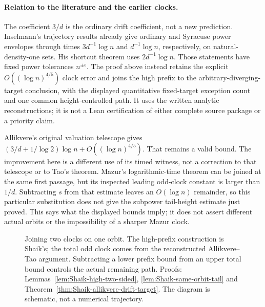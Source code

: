 \paragraph{Relation to the literature and the earlier clocks.}
The coefficient \(3/d\) is the ordinary drift coefficient, not a new
prediction. Inselmann's \cite[Theorems 1.9--1.10]{Inselmann2024v3}
trajectory results already give ordinary and Syracuse power envelopes
through times \(3d^{-1}\log n\) and \(d^{-1}\log n\), respectively,
on natural-density-one sets. His shortcut theorem uses
\(2d^{-1}\log n\). Those statements have fixed power tolerances
\(n^{\pm\epsilon}\). The proof above instead retains the explicit
\(O((\log n)^{4/5})\) clock error and joins the high prefix to the
arbitrary-diverging-target conclusion, with the displayed quantitative
fixed-target exception count and one common height-controlled path.
It uses the written analytic reconstructions; it is not a Lean
certification of either complete source package or a priority claim.

Allikvere's original valuation telescope gives
\((3/d+1/\log2)\log n+O((\log n)^{4/5})\).
That remains a valid bound. The improvement here is a different
use of its timed witness, not a correction to that telescope or to
Tao's theorem. Mazur's logarithmic-time theorem can be joined at the
same first passage, but its inspected leading odd-clock constant
is larger than \(1/d\). Subtracting \(s\) from that estimate leaves
an \(O(\log n)\) remainder, so this particular substitution does not
give the subpower tail-height estimate just proved. This says what
the displayed bounds imply; it does not assert different actual
orbits or the impossibility of a sharper Mazur clock.

\begin{figure}[ht]
\centering
{}
\caption{Joining two clocks on one orbit. The high-prefix construction
is Shaik's; the total odd clock comes from the reconstructed
Allikvere--Tao argument. Subtracting a lower prefix bound from an upper
total bound controls the actual remaining path. Proofs:
Lemmas~\ref{lem:Shaik-high-two-sided},
\ref{lem:Shaik-same-orbit-tail} and
Theorem~\ref{thm:Shaik-allikvere-drift-target}.
The diagram is schematic, not a numerical trajectory.}
\end{figure}
